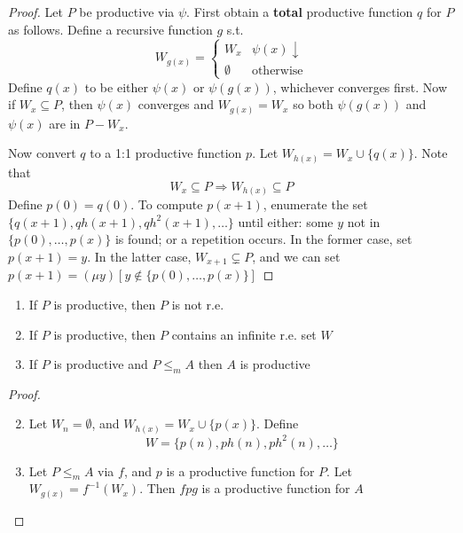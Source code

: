 \documentclass[11pt]{article}
\begin{document}
\begin{proof}
Let \(P\) be productive via \(\psi\). First obtain a \textbf{total} productive function
\(q\) for \(P\) as follows. Define a recursive function \(g\) s.t.
\begin{equation*}
W_{g(x)}=
\begin{cases}
W_x&\psi(x)\downarrow\\
\emptyset&\text{otherwise}
\end{cases}
\end{equation*}
Define \(q(x)\) to be either \(\psi(x)\) or \(\psi(g(x))\), whichever
converges first. Now if \(W_x\subseteq P\), then \(\psi(x)\) converges and
\(W_{g(x)}=W_x\) so both \(\psi(g(x))\) and \(\psi(x)\) are in \(P-W_x\).

Now convert \(q\) to a 1:1 productive function \(p\). Let
\(W_{h(x)}=W_x\cup\{q(x)\}\). Note that
\begin{equation*}
W_x\subseteq P\Longrightarrow W_{h(x)}\subseteq P
\end{equation*}
Define \(p(0)=q(0)\). To compute \(p(x+1)\), enumerate the set
\(\{q(x+1),qh(x+1),qh^2(x+1),\dots\}\) until either: some \(y\) not in
\(\{p(0),\dots,p(x)\}\) is found; or a repetition occurs. In the former case,
set \(p(x+1)=y\). In the latter case, \(W_{x+1}\subsetneq P\), and we can set
\(p(x+1)=(\mu y)[y\not\in\{p(0),\dots,p(x)\}]\)
\end{proof}

\begin{theorem}[]
\begin{enumerate}
\item If \(P\) is productive, then \(P\) is not r.e.
\item If \(P\) is productive, then \(P\) contains an infinite r.e. set \(W\)
\item If \(P\) is productive and \(P\le_m A\) then \(A\) is productive
\end{enumerate}
\end{theorem}

\begin{proof}
\begin{enumerate}
\setcounter{enumi}{1}
\item Let \(W_n=\emptyset\), and \(W_{h(x)}=W_x\cup\{p(x)\}\). Define
\begin{equation*}
W=\{p(n),ph(n),ph^2(n),\dots\}
\end{equation*}
\item Let \(P\le_m A\) via \(f\), and \(p\) is a productive function for \(P\).
Let \(W_{g(x)}=f^{-1}(W_x)\). Then \(fpg\) is a productive function for \(A\)
\end{enumerate}
\end{proof}
\end{document}
